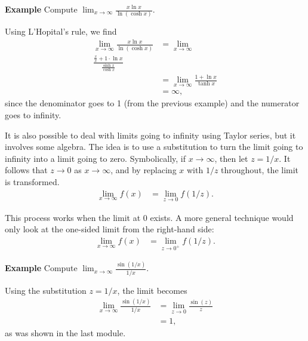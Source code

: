 \documentclass[a4paper]{book}
\begin{document}
\begin{sloppypar}
\textbf{Example} Compute $ \displaystyle \lim_{x \rightarrow \infty} \frac{x \ln x}{\ln(\cosh x)}$. 
\begin{examplebox}
Using L'Hopital's rule, we find
\begin{align*}
\lim_{x \rightarrow \infty} \frac{ x \ln x}{\ln (\cosh x) } &= \lim_{x \rightarrow \infty} \\ \frac{\frac{x}{x} + 1 \cdot \ln x}{\frac{\sinh x}{\cosh x}} \\
&= \lim_{x \rightarrow \infty} \frac{1+ \ln x}{\tanh x} \\
&= \infty,
\end{align*}
since the denominator goes to 1 (from the previous example) and the numerator goes to infinity.
\end{examplebox}

It is also possible to deal with limits going to infinity using Taylor series, but it involves some algebra. The idea is to use a substitution to turn the limit going to infinity into a limit going to zero. Symbolically, if $x \rightarrow \infty$, then let $z = 1/x$. It follows that $z \rightarrow 0$ as $x \rightarrow \infty$, and by replacing $x$ with $1/z$ throughout, the limit is transformed.
\begin{align*}
\lim_{x \rightarrow \infty} f(x) &= \lim_{z \rightarrow 0} f(1/z).
\end{align*}

This process works when the limit at 0 exists. A more general technique would only look at the one-sided limit from the right-hand side:
\begin{align*}
\lim_{x \rightarrow \infty} f(x) &= \lim_{z \rightarrow 0^+} f(1/z).
\end{align*}

\textbf{Example} Compute $\displaystyle \lim_{x \rightarrow \infty} \frac{\sin(1/x)}{1/x}$.
\begin{examplebox}
Using the substitution $z = 1/x$, the limit becomes
\begin{align*}
\lim_{x \rightarrow \infty} \frac{\sin(1/x)}{1/x} &= \lim_{z \rightarrow 0} \frac{\sin(z)}{z} \\
&= 1,
\end{align*}
as was shown in the last module.
\end{examplebox}


\end{sloppypar}
\end{document}
